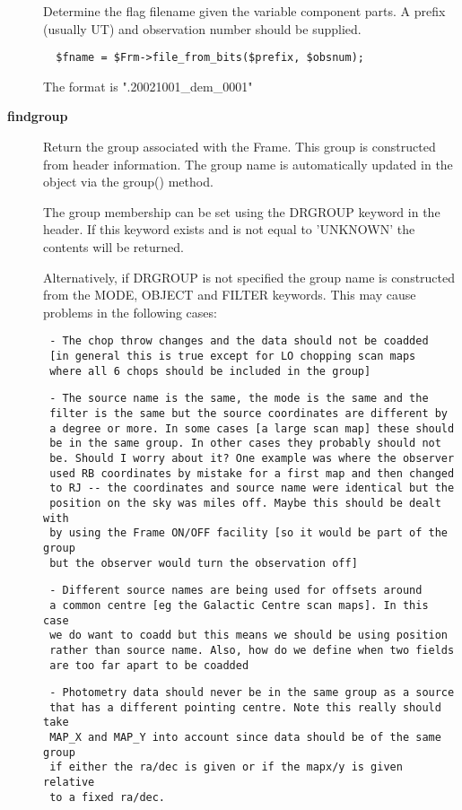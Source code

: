 \begin{description}
Determine the flag filename given the variable component
parts. A prefix (usually UT) and observation number should
be supplied.

\begin{verbatim}
  $fname = $Frm->file_from_bits($prefix, $obsnum);
\end{verbatim}


The format is ".20021001\_dem\_0001"


\item[{\textbf{findgroup}}] \mbox{}

Return the group associated with the Frame. This group is constructed
from header information. The group name is automatically updated in
the object via the group() method.



The group membership can be set using the DRGROUP keyword in the
header. If this keyword exists and is not equal to 'UNKNOWN' the
contents will be returned.



Alternatively, if DRGROUP is not specified the group name is
constructed from the MODE, OBJECT and FILTER keywords. This may cause
problems in the following cases:

\begin{verbatim}
 - The chop throw changes and the data should not be coadded
 [in general this is true except for LO chopping scan maps
 where all 6 chops should be included in the group]
\end{verbatim}
\begin{verbatim}
 - The source name is the same, the mode is the same and the
 filter is the same but the source coordinates are different by
 a degree or more. In some cases [a large scan map] these should
 be in the same group. In other cases they probably should not
 be. Should I worry about it? One example was where the observer
 used RB coordinates by mistake for a first map and then changed
 to RJ -- the coordinates and source name were identical but the
 position on the sky was miles off. Maybe this should be dealt with
 by using the Frame ON/OFF facility [so it would be part of the group
 but the observer would turn the observation off]
\end{verbatim}
\begin{verbatim}
 - Different source names are being used for offsets around
 a common centre [eg the Galactic Centre scan maps]. In this case
 we do want to coadd but this means we should be using position
 rather than source name. Also, how do we define when two fields
 are too far apart to be coadded
\end{verbatim}
\begin{verbatim}
 - Photometry data should never be in the same group as a source
 that has a different pointing centre. Note this really should take
 MAP_X and MAP_Y into account since data should be of the same group
 if either the ra/dec is given or if the mapx/y is given relative
 to a fixed ra/dec.
\end{verbatim}



\end{description}
